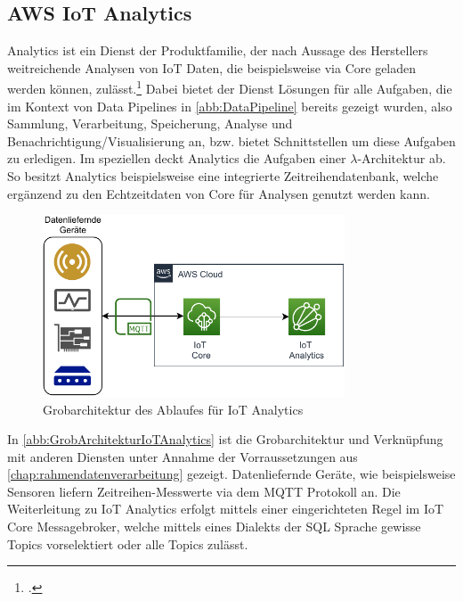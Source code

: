 \subsection{AWS IoT Analytics} \label{productselection:iotanalytics}
\AWSIOT Analytics ist ein Dienst der \AWSIOT Produktfamilie, der nach Aussage des Herstellers weitreichende Analysen von \ac{IoT} Daten, die beispielsweise via \AWSIOT Core geladen werden können, zulässt.\footcite[Vgl. auch im Folgenden][]{AmazonWebServicesInc..o.J.c} Dabei bietet der Dienst Lösungen für alle Aufgaben, die im Kontext von Data Pipelines in \autoref{abb:DataPipeline} bereits gezeigt wurden, also Sammlung, Verarbeitung, Speicherung, Analyse und Benachrichtigung/Visualisierung an, bzw. bietet Schnittstellen um diese Aufgaben zu erledigen. Im speziellen deckt \AWSIOT Analytics die Aufgaben einer $\lambda$-Architektur ab. So besitzt \AWSIOT Analytics beispielsweise eine integrierte Zeitreihendatenbank, welche ergänzend zu den Echtzeitdaten von \AWSIOT Core für Analysen genutzt werden kann.
\begin{figure}[H]
\centering
\includegraphics[width=0.8\textwidth]{graphics/IoT-Analytics-general.pdf}
\caption{Grobarchitektur des Ablaufes für IoT Analytics}
\label{abb:GrobArchitekturIoTAnalytics}
\end{figure}
In \autoref{abb:GrobArchitekturIoTAnalytics} ist die Grobarchitektur und Verknüpfung mit anderen Diensten unter Annahme der Vorraussetzungen aus \autoref{chap:rahmendatenverarbeitung} gezeigt. Datenliefernde Geräte, wie beispielsweise Sensoren liefern Zeitreihen-Messwerte via dem \ac{MQTT} Protokoll an. Die Weiterleitung zu IoT Analytics erfolgt mittels einer eingerichteten Regel im \ac{IoT} Core Messagebroker, welche mittels eines Dialekts der SQL Sprache gewisse Topics vorselektiert oder alle Topics zulässt.


